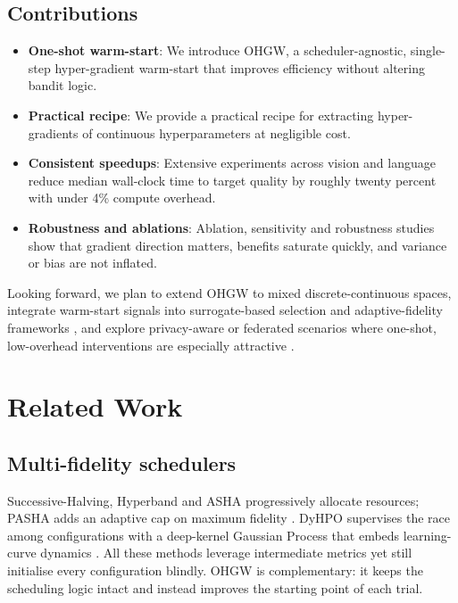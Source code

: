 \documentclass{article}
\begin{document}
\subsection{Contributions}
\begin{itemize}
  \item \textbf{One-shot warm-start}: We introduce OHGW, a scheduler-agnostic, single-step hyper-gradient warm-start that improves efficiency without altering bandit logic.
  \item \textbf{Practical recipe}: We provide a practical recipe for extracting hyper-gradients of continuous hyperparameters at negligible cost.
  \item \textbf{Consistent speedups}: Extensive experiments across vision and language reduce median wall-clock time to target quality by roughly twenty percent with under 4\% compute overhead.
  \item \textbf{Robustness and ablations}: Ablation, sensitivity and robustness studies show that gradient direction matters, benefits saturate quickly, and variance or bias are not inflated.
\end{itemize}

Looking forward, we plan to extend OHGW to mixed discrete-continuous spaces, integrate warm-start signals into surrogate-based selection \cite{khazi-2023-deep} and adaptive-fidelity frameworks \cite{jiang-2024-efficient}, and explore privacy-aware or federated scenarios where one-shot, low-overhead interventions are especially attractive \cite{panda-2022-new,khodak-2021-federated}.

\section{Related Work}
\subsection{Multi-fidelity schedulers}
Successive-Halving, Hyperband and ASHA progressively allocate resources; PASHA adds an adaptive cap on maximum fidelity \cite{bohdal-2022-pasha}. DyHPO supervises the race among configurations with a deep-kernel Gaussian Process that embeds learning-curve dynamics \cite{wistuba-2022-supervising}. All these methods leverage intermediate metrics yet still initialise every configuration blindly. OHGW is complementary: it keeps the scheduling logic intact and instead improves the starting point of each trial.
\end{document}
